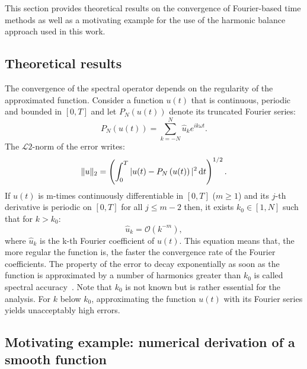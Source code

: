 
This section provides theoretical results on the
convergence of Fourier-based time methods as well
as a motivating example for the use of the harmonic
balance approach used in this work.

\subsection{Theoretical results}
\label{sub:spectral_accuracy}

The convergence of the spectral operator depends on
the regularity of the approximated function. Consider a function
$u(t)$ that is continuous, periodic and bounded in $[0,T]$
and let $P_N \left(u(t)\right)$ denote its truncated Fourier series:
\begin{equation}
    P_N \left(u(t)\right) = \sum_{k=-N}^{N} \widehat{u}_k e^{i k\omega t}.
\end{equation}
The $\mathcal{L}2$-norm of the error writes:
\begin{equation}
   \| u \|_2 = \left(\int_0^T |u(t) - P_N \left(u(t)\right)|^2 \mathop{}\!\mathrm{d} t \right)^{1/2}.
\end{equation}
If $u(t)$ is m-times continuously differentiable in $[0,T]$ ($m \geq 1$) 
and its $j$-th derivative is periodic on $[0,T]$ for all $j \leq m - 2$
then, it exists  $k_0 \in [1, N]$ such that for $k > k_0$:
\begin{equation}
    \widehat{u}_k = \mathcal{O} (k^{-m}),
\end{equation}
where $\widehat{u}_k$ is the k-th Fourier coefficient of $u(t)$.
This equation means that, the more regular the function is,
the faster the convergence rate of the Fourier
coefficients.
The property of the error to decay exponentially as soon as 
the function is approximated by a number of harmonics greater than $k_0$ 
is called spectral accuracy~\cite{Canuto2006}. Note that
$k_0$ is not known but is rather essential for the analysis.
For $k$ below $k_0$, approximating the function $u(t)$ with its Fourier
series yields unacceptably high errors.

\subsection{Motivating example: numerical derivation of a smooth function}
\label{sec:comparison-hb-method}

